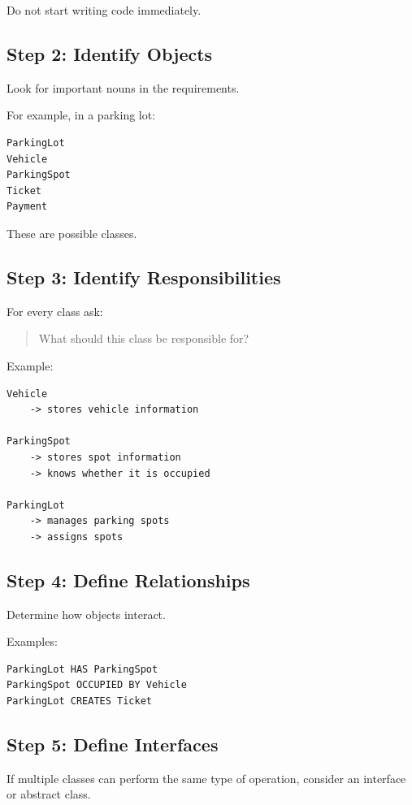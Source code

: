 \documentclass[12pt,a4paper]{article}
\begin{document}
Do not start writing code immediately.

\subsection{Step 2: Identify Objects}

Look for important nouns in the requirements.

For example, in a parking lot:

\begin{verbatim}
ParkingLot
Vehicle
ParkingSpot
Ticket
Payment
\end{verbatim}

These are possible classes.

\subsection{Step 3: Identify Responsibilities}

For every class ask:

\begin{quote}
What should this class be responsible for?
\end{quote}

Example:

\begin{verbatim}
Vehicle
    -> stores vehicle information

ParkingSpot
    -> stores spot information
    -> knows whether it is occupied

ParkingLot
    -> manages parking spots
    -> assigns spots
\end{verbatim}

\subsection{Step 4: Define Relationships}

Determine how objects interact.

Examples:

\begin{verbatim}
ParkingLot HAS ParkingSpot
ParkingSpot OCCUPIED BY Vehicle
ParkingLot CREATES Ticket
\end{verbatim}

\subsection{Step 5: Define Interfaces}

If multiple classes can perform the same type of operation, consider an interface or abstract class.
\end{document}
